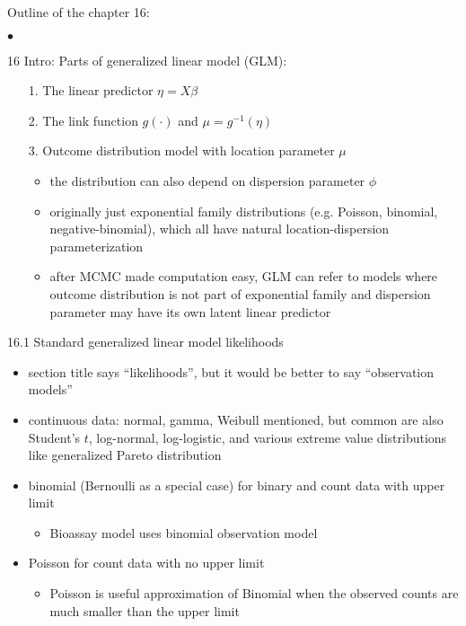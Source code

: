 \documentclass[a4paper,11pt]{article}
\begin{document}
\vspace{\baselineskip}
\noindent
Outline of the chapter 16:
\begin{list}{$\bullet$}{\parsep=0pt\itemsep=2pt}
\item[16 Intro:]
  Parts of generalized linear model (GLM):
  \begin{itemize}
  \item[1.] The linear predictor $\eta = X\beta$
  \item[2.] The link function $g(\cdot)$ and $\mu = g^{-1}(\eta)$
  \item[3.] Outcome distribution model with location parameter $\mu$
    \begin{itemize}
    \item the distribution can also depend on dispersion
      parameter $\phi$
    \item originally just exponential family distributions
      (e.g. Poisson, binomial, negative-binomial), which all have
      natural location-dispersion parameterization
    \item after MCMC made computation easy, GLM can refer to
      models where outcome distribution is not part of exponential
      family and dispersion parameter may have its own latent linear
      predictor
    \end{itemize}
  \end{itemize}
\item[16.1] Standard generalized linear model likelihoods
  \begin{itemize}
  \item section title says ``likelihoods'', but it would be better to say ``observation models''
  \item continuous data: normal, gamma, Weibull mentioned, but common
    are also Student's $t$, log-normal, log-logistic, and various
    extreme value distributions like generalized Pareto distribution
  \item binomial (Bernoulli as a special case) for binary and count
    data with upper limit
    \begin{itemize}
    \item Bioassay model uses binomial observation model
    \end{itemize}
  \item Poisson for count data with no upper limit
    \begin{itemize}
    \item Poisson is useful approximation of Binomial when the observed
      counts are much smaller than the upper limit

\end{itemize}
\end{itemize}
\end{list}
\end{document}
